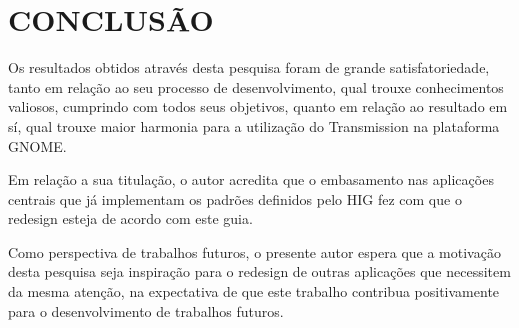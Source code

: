 \chapter{CONCLUSÃO}

Os resultados obtidos através desta pesquisa foram de grande satisfatoriedade,
tanto em relação ao seu processo de desenvolvimento, qual trouxe conhecimentos
valiosos, cumprindo com todos seus objetivos, quanto em relação ao resultado em
sí, qual trouxe maior harmonia para a utilização do Transmission na plataforma
GNOME.

Em relação a sua titulação, o autor acredita que o embasamento nas aplicações
centrais que já implementam os padrões definidos pelo HIG fez com que o redesign
esteja de acordo com este guia.

Como perspectiva de trabalhos futuros, o presente autor espera que a motivação
desta pesquisa seja inspiração para o redesign de outras aplicações que
necessitem da mesma atenção, na expectativa de que este trabalho contribua
positivamente para o desenvolvimento de trabalhos futuros.
